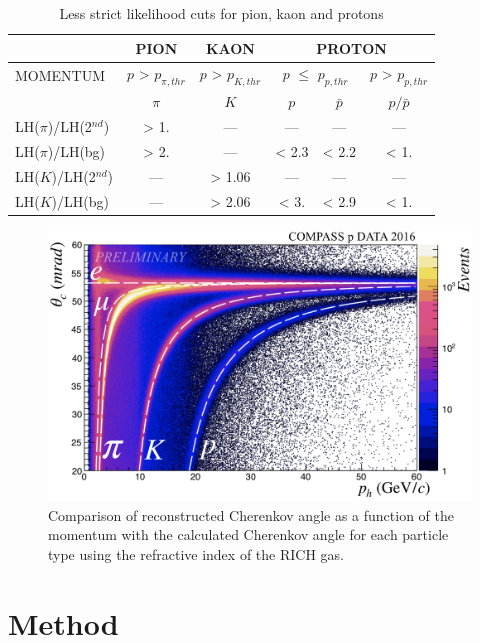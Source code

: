 \begin{table}[!h]
  \caption{Less strict likelihood cuts for pion, kaon and protons}
  \label{tab:LHlessstrict}
  \centering
  \begin{tabular}{lccccc}
    \hline
     & PION & KAON & \multicolumn{3}{c}{PROTON} \\
    \hline
    MOMENTUM & $p$ > $p_{\pi,thr}$ & $p$ > $p_{K,thr}$ & \multicolumn{2}{c}{$p$ $\leq$ $p_{p,thr}$} & $p$ > $p_{p,thr}$ \\
     & $\pi$ & $K$ & $p$ & $\bar{p}$ & $p/\bar{p}$ \\
    LH($\pi$)/LH(2$^{nd}$) & > 1. & --- & --- & --- & --- \\
    LH($\pi$)/LH(bg) & > 2. & --- & < 2.3 & < 2.2 & < 1. \\
    LH($K$)/LH(2$^{nd}$) & --- & > 1.06 & --- & --- & ---\\
    LH($K$)/LH(bg) & --- & > 2.06 & < 3. & < 2.9 & < 1. \\
    \hline
  \end{tabular}
\end{table}

\begin{figure}[!h]
  \centering
	\includegraphics[scale=0.45]{./gfx/RICHIndices.png}
	\caption{Comparison of reconstructed Cherenkov angle as a function of the momentum with the calculated Cherenkov angle for each particle type using the refractive index of the RICH gas.}
	\label{pic:RefIndex}
\end{figure}

\section{Method}

